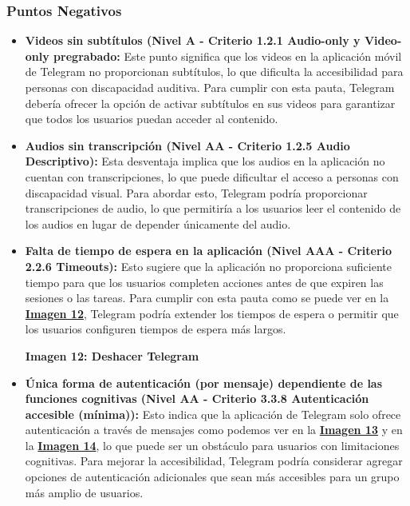 \documentclass[a4paper]{article}
\newcommand{\deshacerTelegram}{deshacerTelegram.jpg}
\begin{document}
    \subsubsection{Puntos Negativos}
    \begin{itemize}
        \item \textbf{Videos sin subtítulos (Nivel A - Criterio 1.2.1 Audio-only y Video-only pregrabado:} Este punto significa que los videos en la aplicación móvil de Telegram no proporcionan subtítulos, lo que dificulta la accesibilidad para personas con discapacidad auditiva. Para cumplir con esta pauta, Telegram debería ofrecer la opción de activar subtítulos en sus videos para garantizar que todos los usuarios puedan acceder al contenido.
        
        \item \textbf{Audios sin transcripción (Nivel AA - Criterio 1.2.5 Audio Descriptivo):} Esta desventaja implica que los audios en la aplicación no cuentan con transcripciones, lo que puede dificultar el acceso a personas con discapacidad visual. Para abordar esto, Telegram podría proporcionar transcripciones de audio, lo que permitiría a los usuarios leer el contenido de los audios en lugar de depender únicamente del audio.
        
        \item \textbf{Falta de tiempo de espera en la aplicación (Nivel AAA - Criterio 2.2.6 Timeouts):} Esto sugiere que la aplicación no proporciona suficiente tiempo para que los usuarios completen acciones antes de que expiren las sesiones o las tareas. Para cumplir con esta pauta como se puede ver en la \textbf{\hyperref[fig:imagen-deshacer-telegram-undo]{Imagen 12}}, Telegram podría extender los tiempos de espera o permitir que los usuarios configuren tiempos de espera más largos.
        
        \begin{center}
            \vspace{0.2cm}\par
            \textbf{Imagen 12: Deshacer Telegram\label{fig:imagen-deshacer-telegram-undo}}
        \end{center}\vspace{0.1cm}
        
        \item \textbf{Única forma de autenticación (por mensaje) dependiente de las funciones cognitivas (Nivel AA - Criterio 3.3.8 Autenticación accesible (mínima)):} Esto indica que la aplicación de Telegram solo ofrece autenticación a través de mensajes como podemos ver en la \textbf{\hyperref[fig:imagen-numero-telefono-telegram]{Imagen 13}} y en la \textbf{\hyperref[fig:imagen-mensaje-telefono-telegram]{Imagen 14}}, lo que puede ser un obstáculo para usuarios con limitaciones cognitivas. Para mejorar la accesibilidad, Telegram podría considerar agregar opciones de autenticación adicionales que sean más accesibles para un grupo más amplio de usuarios.
        

\end{itemize}
\end{document}
